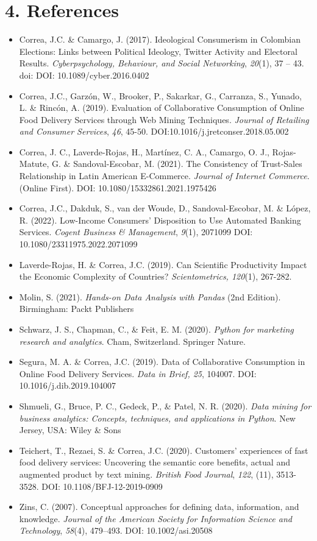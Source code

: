 \documentclass[letterpaper,11pt]{article}
\begin{document}
\section{4. References}
\begin{itemize}
\item Correa, J.C. \& Camargo, J. (2017). Ideological Consumerism in Colombian Elections: Links between Political Ideology, Twitter Activity and Electoral Results. \textit{Cyberpsychology, Behaviour, and Social Networking}, \textit{20}(1), 37 – 43. doi: DOI: 10.1089/cyber.2016.0402
\item Correa, J.C., Garzón, W., Brooker, P., Sakarkar, G., Carranza, S., Yunado, L. \& Rincón, A. (2019). Evaluation of Collaborative Consumption of Online Food Delivery Services through Web Mining Techniques. \textit{Journal of Retailing and Consumer Services}, \textit{46}, 45-50. DOI:10.1016/j.jretconser.2018.05.002
\item Correa, J. C., Laverde-Rojas, H., Martínez, C. A., Camargo, O. J., Rojas-Matute, G. \& Sandoval-Escobar, M. (2021). The Consistency of Trust-Sales Relationship in Latin American E-Commerce. \textit{Journal of Internet Commerce}. (Online First). DOI: 10.1080/15332861.2021.1975426
\item Correa, J.C., Dakduk, S., van der Woude, D., Sandoval-Escobar, M. \& López, R. (2022). Low-Income Consumers’ Disposition to Use Automated Banking Services. \textit{Cogent Business \& Management}, \textit{9}(1), 2071099 DOI: 10.1080/23311975.2022.2071099
\item Laverde-Rojas, H. \& Correa, J.C. (2019). Can Scientific Productivity Impact the Economic Complexity of Countries? \textit{Scientometrics, 120}(1), 267-282. 
\item Molin, S. (2021). \textit{Hands-on Data Analysis with Pandas} (2nd Edition). Birmingham: Packt Publishers
\item Schwarz, J. S., Chapman, C., \& Feit, E. M. (2020). \textit{Python for marketing research and analytics}. Cham, Switzerland. Springer Nature. 
\item Segura, M. A. \& Correa, J.C. (2019). Data of Collaborative Consumption in Online Food Delivery Services. \textit{Data in Brief, 25}, 104007. DOI: 10.1016/j.dib.2019.104007
\item Shmueli, G., Bruce, P. C., Gedeck, P., \& Patel, N. R. (2020). \textit{Data mining for business analytics: Concepts, techniques, and applications in Python}. New Jersey, USA: Wiley & Sons 
\item Teichert, T., Rezaei, S. \& Correa, J.C. (2020). Customers’ experiences of fast food delivery services: Uncovering the semantic core benefits, actual and augmented product by text mining. \textit{British Food Journal}, \textit{122}, (11), 3513-3528. DOI: 10.1108/BFJ-12-2019-0909
\item Zins, C. (2007). Conceptual approaches for defining data, information, and knowledge. \textit{Journal of the American Society for Information Science and Technology}, \textit{58}(4), 479–493. DOI: 10.1002/asi.20508
\end{itemize}
\end{document}
